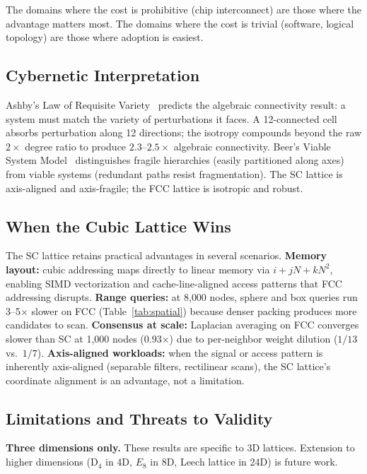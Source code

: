 \documentclass[11pt]{article}
\begin{document}
The domains where the cost is prohibitive (chip interconnect) are
those where the advantage matters most. The domains where the cost
is trivial (software, logical topology) are those where adoption is
easiest.

\subsection{Cybernetic Interpretation}

Ashby's Law of Requisite Variety~\cite{ashby1956} predicts the
algebraic connectivity result: a system must match the variety of
perturbations it faces. A 12-connected cell absorbs perturbation
along 12 directions; the isotropy compounds beyond the raw $2\times$
degree ratio to produce $2.3$--$2.5\times$ algebraic connectivity.
Beer's Viable System Model~\cite{beer1972} distinguishes fragile
hierarchies (easily partitioned along axes) from viable systems
(redundant paths resist fragmentation). The SC lattice is axis-aligned
and axis-fragile; the FCC lattice is isotropic and robust.

\subsection{When the Cubic Lattice Wins}

The SC lattice retains practical advantages in several scenarios.
\textbf{Memory layout:} cubic addressing maps directly to linear
memory via $i + jN + kN^2$, enabling SIMD vectorization and
cache-line-aligned access patterns that FCC addressing disrupts.
\textbf{Range queries:} at 8{,}000 nodes, sphere and box queries
run 3--5$\times$ slower on FCC (Table~\ref{tab:spatial}) because
denser packing produces more candidates to scan.
\textbf{Consensus at scale:} Laplacian averaging on FCC converges
slower than SC at 1{,}000 nodes (0.93$\times$) due to per-neighbor
weight dilution ($1/13$ vs.\ $1/7$).
\textbf{Axis-aligned workloads:} when the signal or access pattern
is inherently axis-aligned (separable filters, rectilinear scans),
the SC lattice's coordinate alignment is an advantage, not a
limitation.

\subsection{Limitations and Threats to Validity}

\textbf{Three dimensions only.} These results are specific to 3D
lattices. Extension to higher dimensions (D$_4$ in 4D, $E_8$ in
8D, Leech lattice in 24D) is future work.
\end{document}
